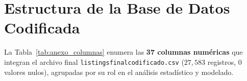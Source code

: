 \documentclass[12pt,letterpaper,oneside]{report}
\newcommand{\ub}{\textunderscore\allowbreak}
\begin{document}
\clearpage
{}
\renewcommand{\bibname}{Referencias Bibliográficas}



\appendix
\chapter{Estructura de la Base de Datos Codificada}
\label{anexo:columnas}

La Tabla~\ref{tab:anexo_columnas} enumera las \textbf{37 columnas numéricas} que integran el archivo final \texttt{listings\ub final\ub codificado.csv} ($27{,}583$ registros, $0$ valores nulos), agrupadas por su rol en el análisis estadístico y modelado.
\end{document}
